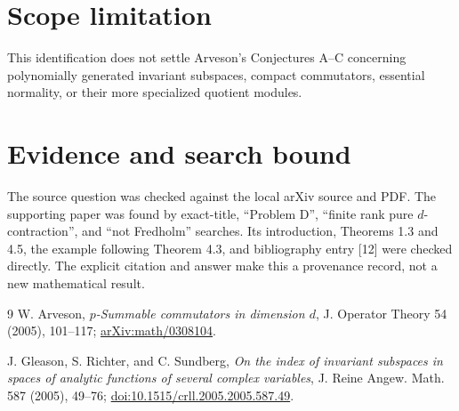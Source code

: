 \documentclass[11pt]{article}
\begin{document}
\section*{Scope limitation}
This identification does not settle Arveson's Conjectures A--C concerning
polynomially generated invariant subspaces, compact commutators, essential
normality, or their more specialized quotient modules.

\section*{Evidence and search bound}
The source question was checked against the local arXiv source and PDF. The
supporting paper was found by exact-title, ``Problem D'', ``finite rank pure
$d$-contraction'', and ``not Fredholm'' searches. Its introduction, Theorems
1.3 and 4.5, the example following Theorem 4.3, and bibliography entry [12]
were checked directly. The explicit citation and answer make this a provenance
record, not a new mathematical result.

\begin{thebibliography}{9}
W. Arveson,
\emph{$p$-Summable commutators in dimension $d$},
J. Operator Theory 54 (2005), 101--117;
\href{https://arxiv.org/abs/math/0308104}{arXiv:math/0308104}.

J. Gleason, S. Richter, and C. Sundberg,
\emph{On the index of invariant subspaces in spaces of analytic functions of several complex variables},
J. Reine Angew. Math. 587 (2005), 49--76;
\href{https://doi.org/10.1515/crll.2005.2005.587.49}{doi:10.1515/crll.2005.2005.587.49}.
\end{thebibliography}
\end{document}
